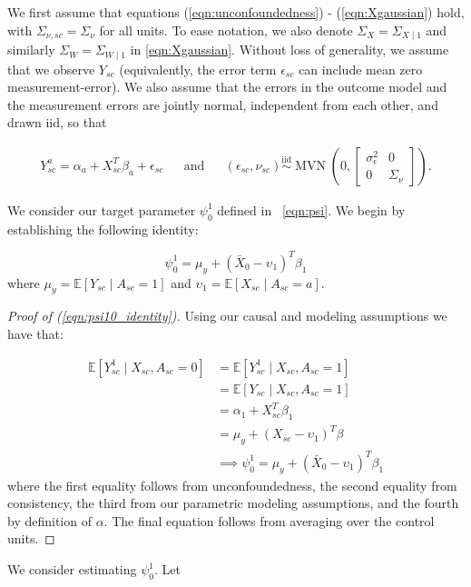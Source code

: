 We first assume that equations (\ref{eqn:unconfoundedness}) - (\ref{eqn:Xgaussian}) hold, with $\Sigma_{\nu,sc} = \Sigma_{\nu}$ for all units. To ease notation, we also denote $\Sigma_X = \Sigma_{X \mid 1}$ and similarly $ \Sigma_W = \Sigma_{W \mid 1}$ in \eqref{eqn:Xgaussian}. Without loss of generality, we assume that we observe $Y_{sc}$ (equivalently, the error term $\epsilon_{sc}$ can include mean zero measurement-error). We also assume that the errors in the outcome model and the measurement errors are jointly normal, independent from each other, and drawn iid, so that 

\begin{align}\label{eqn:cevoutcomemodel}
Y_{sc}^a = \alpha_a + X_{sc}^T\beta_a + \epsilon_{sc} & & \text{and} & & (\epsilon_{sc}, \nu_{sc}) \stackrel{\text{iid}}{\sim} \operatorname{MVN}\left(0, \left[\begin{array}{cc} \sigma_{\epsilon}^2 & 0 \\ 0 & \Sigma_{\nu} \end{array}\right] \right).
\end{align}

We consider our target parameter $\psi_0^1$ defined in ~\eqref{eqn:psi}. We begin by establishing the following identity:

\begin{equation}\label{eqn:psi10_identity}
\psi^1_0 = \mu_y + (\bar{X}_0 - \upsilon_1)^T\beta_1
\end{equation}
%
where $\mu_y = \mathbb{E}[Y_{sc} \mid A_{sc} = 1]$ and $\upsilon_1 = \mathbb{E}[X_{sc} \mid A_{sc} = a]$.

\begin{proof}[Proof of (\ref{eqn:psi10_identity})]
Using our causal and modeling assumptions we have that:

\begin{align*}
\mathbb{E}[Y_{sc}^1 \mid X_{sc}, A_{sc} = 0] &= \mathbb{E}[Y_{sc}^1 \mid X_{sc}, A_{sc} = 1] \\
&= \mathbb{E}[Y_{sc} \mid X_{sc}, A_{sc} = 1] \\
&= \alpha_1 + X_{sc}^T\beta_1 \\
&= \mu_y + (X_{sc} - \upsilon_1)^T\beta \\
&\implies \psi_0^1 = \mu_y + (\bar{X}_0 - \upsilon_1)^T\beta_1
\end{align*}
%
where the first equality follows from unconfoundedness, the second equality from consistency, the third from our parametric modeling assumptions, and the fourth by definition of $\alpha$. The final equation follows from averaging over the control units.
\end{proof}
%
We consider estimating $\psi_0^1$. Let 

